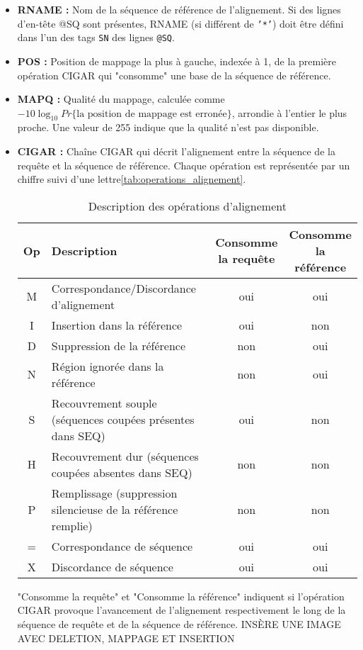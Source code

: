 \begin{itemize}
    \item \textbf{RNAME :} Nom de la séquence de référence de l'alignement.
    Si des lignes d'en-tête @SQ sont présentes, RNAME (si différent de \texttt{'*'}) doit être défini dans l'un des tags \texttt{SN} des lignes \texttt{@SQ}.

    \item \textbf{POS :} Position de mappage la plus à gauche, indexée à 1, de la première opération CIGAR qui "consomme" une base de la séquence de référence.

    \item \textbf{MAPQ :} Qualité du mappage, calculée comme $-10 \log_{10} Pr\{\text{la position de mappage est erronée}\}$, arrondie à l'entier le plus proche.
    Une valeur de 255 indique que la qualité n'est pas disponible.

    \item \textbf{CIGAR :} Chaîne CIGAR qui décrit l'alignement entre la séquence de la requête et la séquence de référence.
    Chaque opération est représentée par un chiffre suivi d'une lettre\autoref{tab:operations_alignement}.
    \begin{table}[h!]
        \centering
        \begin{tabular}{clcc}
        \hline
        \textbf{Op} & \textbf{Description} &
        \makecell{\textbf{Consomme}\\\textbf{la requête}} &
        \makecell{\textbf{Consomme}\\\textbf{la référence}} \\ \hline
        M & Correspondance/Discordance d'alignement & oui & oui \\
        I & Insertion dans la référence & oui & non \\
        D & Suppression de la référence & non & oui \\
        N & Région ignorée dans la référence & non & oui \\
        S & Recouvrement souple (séquences coupées présentes dans SEQ) & oui & non \\
        H & Recouvrement dur (séquences coupées absentes dans SEQ) & non & non \\
        P & Remplissage (suppression silencieuse de la référence remplie) & non & non \\
        = & Correspondance de séquence & oui & oui \\
        X & Discordance de séquence & oui & oui \\ \hline
        \end{tabular}
        \caption{Description des opérations d'alignement}
        \label{tab:operations_alignement}
    \end{table}
    "Consomme la requête" et "Consomme la référence" indiquent si l'opération CIGAR provoque l'avancement de l'alignement respectivement le long de la séquence de requête et de la séquence de référence.
    INSÈRE UNE IMAGE AVEC DELETION, MAPPAGE ET INSERTION


\end{itemize}
